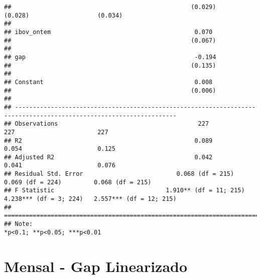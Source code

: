 \documentclass[
]{article}
\begin{document}
\begin{verbatim}
##                                                  (0.029)                (0.028)                   (0.034)          
##                                                                                                                    
## ibov_ontem                                        0.070                                                            
##                                                  (0.067)                                                           
##                                                                                                                    
## gap                                               -0.194                                                           
##                                                  (0.135)                                                           
##                                                                                                                    
## Constant                                          0.008                                                            
##                                                  (0.006)                                                           
##                                                                                                                    
## -------------------------------------------------------------------------------------------------------------------
## Observations                                       227                    227                       227            
## R2                                                0.089                  0.054                     0.125           
## Adjusted R2                                       0.042                  0.041                     0.076           
## Residual Std. Error                          0.068 (df = 215)       0.069 (df = 224)         0.068 (df = 215)      
## F Statistic                               1.910** (df = 11; 215) 4.238*** (df = 3; 224)   2.557*** (df = 12; 215)  
## ===================================================================================================================
## Note:                                                                                   *p<0.1; **p<0.05; ***p<0.01
\end{verbatim}

\hypertarget{mensal---gap-linearizado}{%
\section{Mensal - Gap Linearizado}\label{mensal---gap-linearizado}}
\end{document}
